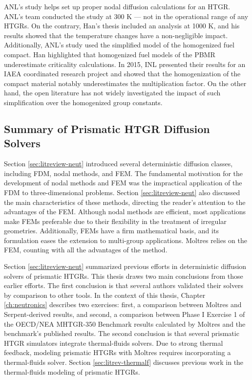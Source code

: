 ANL's study helps set up proper nodal diffusion calculations for an \gls{HTGR}.
ANL's team conducted the study at 300 K --- not in the operational range of any \glspl{HTGR}.
On the contrary, Han's thesis included an analysis at 1000 K, and his results showed that the temperature changes have a non-negligible impact.
Additionally, ANL's study used the simplified model of the homogenized fuel compact.
Han highlighted that homogenized fuel models of the \gls{PBMR} underestimate criticality calculations.
In 2015, \gls{INL} presented their results \cite{strydom_results_2015} for an \gls{IAEA} coordinated research project \cite{tyobeka_htgr_2011} and showed that the homogenization of the compact material notably underestimates the multiplication factor.
On the other hand, the open literature has not widely investigated the impact of such simplification over the homogenized group constants.

\subsection{Summary of Prismatic HTGR Diffusion Solvers}

Section \ref{sec:litreview-neut} introduced several deterministic diffusion classes, including FDM, nodal methods, and FEM.
The fundamental motivation for the development of nodal methods and FEM was the impractical application of the \gls{FDM} to three-dimensional problems.
Section \ref{sec:litreview-neut} also discussed the main characteristics of these methods, directing the reader's attention to the advantages of the FEM.
Although nodal methods are efficient, most applications make FEMs preferable due to their flexibility in the treatment of irregular geometries.
Additionally, FEMs have a firm mathematical basis, and its formulation eases the extension to multi-group applications.
Moltres relies on the FEM, counting with all the advantages of the method.

Section \ref{sec:litreview-neut} summarized previous efforts in deterministic diffusion solvers of prismatic HTGRs.
This thesis draws two main conclusions from those earlier efforts.
The first conclusion is that several authors validated their solvers by comparison to other tools.
In the context of this thesis, Chapter \ref{ch:neutronics} describes two exercises: first, a comparison between Moltres and Serpent-derived results, and second, a comparison between Phase I Exercise 1 of the OECD/NEA MHTGR-350 Benchmark results calculated by Moltres and the benchmark's published results.
The second conclusion is that several prismatic HTGR simulators integrate thermal-fluids solvers.
Due to strong thermal feedback, modeling prismatic HTGRs with Moltres requires incorporating a thermal-fluids solver.
Section \ref{sec:litrev-thermalf} discusses previous work in the thermal-fluids modeling of prismatic HTGRs.

